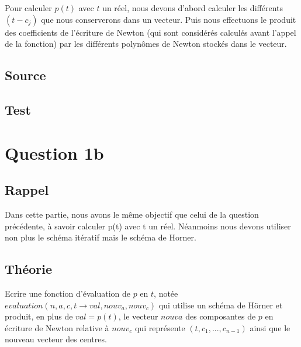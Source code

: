 \documentclass[a4paper,10pt]{report}
\begin{document}
Pour calculer $p(t)$ avec $t$ un réel, nous devons d’abord calculer les différents $(t-c_{j})$ que nous conserverons dans un vecteur. Puis nous effectuons le produit des coefficients de l’écriture de Newton (qui sont considérés calculés avant l’appel de la fonction) par les différents polynômes de Newton stockés dans le vecteur.

\subsection*{Source}

\begin{center}
	
\end{center}

\begin{center}
	
\end{center}

\subsection*{Test}

\section*{Question 1b}

\subsection*{Rappel}

Dans cette partie, nous avons le même objectif que celui de la question précédente, à savoir calculer p(t) avec t un réel. Néanmoins nous devons utiliser non plus le schéma itératif mais le schéma de Horner. 

\subsection*{Théorie}

Ecrire une fonction d’évaluation de $p$ en $t$, notée $evaluation(n, a, c, t →
val, nouv_a, nouv_c)$ qui utilise un schéma de Hörner et produit, en plus de
$val = p(t)$, le vecteur $nouv{a}$ des composantes de $p$ en écriture de Newton
relative à $nouv_c$ qui représente $(t, c_{1}, ..., c_{n−1})$ ainsi que le nouveau vecteur des centres.
\end{document}
